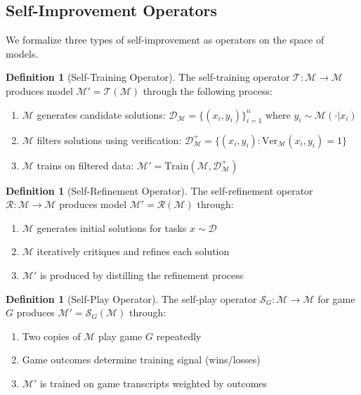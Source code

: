 \documentclass{article}
\theoremstyle{definition}
\newtheorem{definition}[theorem]{Definition}
\theoremstyle{remark}
\newcommand{\M}{\mathcal{M}}  %
\newcommand{\D}{\mathcal{D}}  %
\newcommand{\T}{\mathcal{T}}  %
\newcommand{\Ver}{\text{Ver}}  %
\begin{document}
\subsection{Self-Improvement Operators}

We formalize three types of self-improvement as operators on the space of models.

\begin{definition}[Self-Training Operator]
\label{def:self-training}
The self-training operator \(\T : \mathcal{M} \to \mathcal{M}\) produces model \(\M' = \T(\M)\) through the following process:
\begin{enumerate}
\item \(\M\) generates candidate solutions: \(\D_\M = \{(x_i, y_i)\}_{i=1}^n\) where \(y_i \sim \M(\cdot|x_i)\)
\item \(\M\) filters solutions using verification: \(\D_\M^+ = \{(x_i, y_i) : \Ver_\M(x_i, y_i) = 1\}\)
\item \(\M\) trains on filtered data: \(\M' = \text{Train}(\M, \D_\M^+)\)
\end{enumerate}
\end{definition}

\begin{definition}[Self-Refinement Operator]
\label{def:self-refinement}
The self-refinement operator \(\mathcal{R} : \mathcal{M} \to \mathcal{M}\) produces model \(\M' = \mathcal{R}(\M)\) through:
\begin{enumerate}
\item \(\M\) generates initial solutions for tasks \(x \sim \D\)
\item \(\M\) iteratively critiques and refines each solution
\item \(\M'\) is produced by distilling the refinement process
\end{enumerate}
\end{definition}

\begin{definition}[Self-Play Operator]
\label{def:self-play}
The self-play operator \(\mathcal{S}_G : \mathcal{M} \to \mathcal{M}\) for game \(G\) produces \(\M' = \mathcal{S}_G(\M)\) through:
\begin{enumerate}
\item Two copies of \(\M\) play game \(G\) repeatedly
\item Game outcomes determine training signal (wins/losses)
\item \(\M'\) is trained on game transcripts weighted by outcomes
\end{enumerate}
\end{definition}
\end{document}
